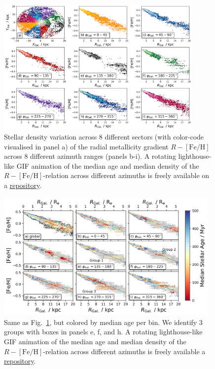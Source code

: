 \documentclass[fleqn,usenatbib]{mnras}
\begin{document}
\begin{figure}
    \centering
    \includegraphics[width=0.9\textwidth]{figures/radial_metallicity_gradients_mw_in_angles.png}
    \caption{Stellar density variation across 8 different sectors (with color-code visualised in panel a) of the radial metallicity gradient $R-\mathrm{[Fe/H]}$ across 8 different azimuth ranges (panels b-i). A rotating lighthouse-like GIF animation of the median age and median density of the $R-\mathrm{[Fe/H]}$-relation across different azimuths is freely available on a \href{https://github.com/svenbuder/nihao_radial_metallicity_gradients/blob/main/figures/xyz_rfeh.gif}{repository}.}
    \label{fig:radial_metallicity_gradients_mw_in_angles}
\end{figure}

\begin{figure}
    \centering
    \includegraphics[width=0.975\textwidth]{figures/radial_metallicity_gradients_mw_in_angles_age.png}
    \caption{Same as Fig.~\ref{fig:radial_metallicity_gradients_mw_in_angles}, but colored by median age per bin. We identify 3 groups with boxes in panels e, f, and h. A rotating lighthouse-like GIF animation of the median age and median density of the $R-\mathrm{[Fe/H]}$-relation across different azimuths is freely available a \href{https://github.com/svenbuder/nihao_radial_metallicity_gradients/blob/main/figures/xyz_rfeh.gif}{repository}.}
    \label{fig:radial_metallicity_gradients_mw_in_angles_age}
\end{figure}
\end{document}
